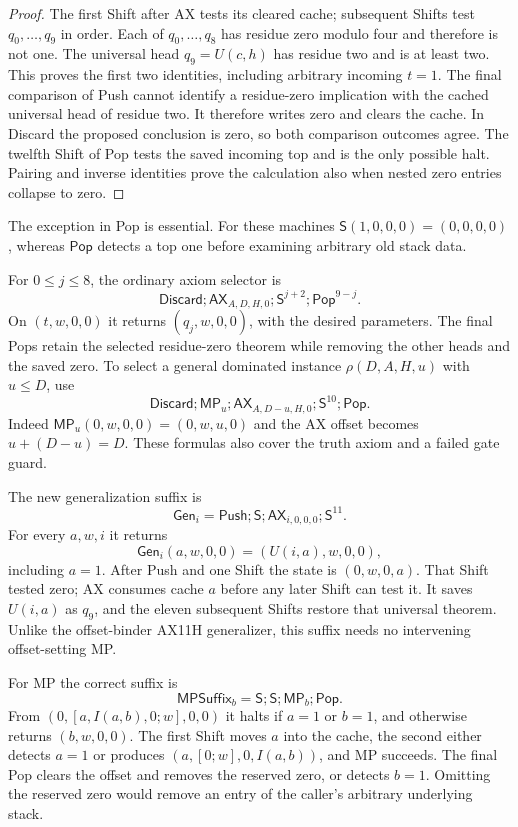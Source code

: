 \documentclass[11pt,a4paper]{article}
\newcommand{\Ax}{\mathsf{AX}}
\newcommand{\MP}{\mathsf{MP}}
\newcommand{\Shift}{\mathsf{S}}
\newcommand{\Push}{\mathsf{Push}}
\newcommand{\Pop}{\mathsf{Pop}}
\newcommand{\Discard}{\mathsf{Discard}}
\newcommand{\Gen}{\mathsf{Gen}}
\begin{document}
\begin{proof}
The first Shift after AX tests its cleared cache; subsequent Shifts
test $q_0,\ldots,q_9$ in order. Each of $q_0,\ldots,q_8$ has residue
zero modulo four and therefore is not one. The universal head
$q_9=U(c,h)$ has residue two and is at least two. This proves the
first two identities, including arbitrary incoming $t=1$.
The final comparison of Push cannot identify a residue-zero
implication with the cached universal head of residue two. It therefore
writes zero and clears the cache. In Discard the proposed conclusion
is zero, so both comparison outcomes agree. The twelfth Shift of Pop
tests the saved incoming top and is the only possible halt. Pairing
and inverse identities prove the calculation also when nested
zero entries collapse to zero.
\end{proof}

The exception in Pop is essential. For these machines
$\Shift(1,0,0,0)=(0,0,0,0)$, whereas $\Pop$ detects a top one before
examining arbitrary old stack data.

For $0\le j\le8$, the ordinary axiom selector is
\[
 \Discard;\Ax_{A,D,H,0};\Shift^{j+2};\Pop^{9-j}.
\]
On $(t,w,0,0)$ it returns $(q_j,w,0,0)$, with the desired parameters.
The final Pops retain the selected residue-zero theorem while removing
the other heads and the saved zero. To select a general dominated
instance $\rho(D,A,H,u)$ with $u\le D$, use
\[
 \Discard;\MP_u;\Ax_{A,D-u,H,0};\Shift^{10};\Pop.
\]
Indeed $\MP_u(0,w,0,0)=(0,w,u,0)$ and the AX offset becomes
$u+(D-u)=D$. These formulas also cover the truth axiom and a failed
gate guard.

The new generalization suffix is
\[
 \boxed{\Gen_i=\Push;\Shift;\Ax_{i,0,0,0};\Shift^{11}.}
\]
For every $a,w,i$ it returns
\[
 \Gen_i(a,w,0,0)=(U(i,a),w,0,0),
\]
including $a=1$. After Push and one Shift the state is $(0,w,0,a)$.
That Shift tested zero; AX consumes cache $a$ before any later Shift
can test it. It saves $U(i,a)$ as $q_9$, and the eleven subsequent
Shifts restore that universal theorem. Unlike the offset-binder
AX11H generalizer, this suffix needs no intervening offset-setting MP.

For MP the correct suffix is
\[
 \mathsf{MPSuffix}_b=\Shift;\Shift;\MP_b;\Pop.
\]
From $(0,[a,I(a,b),0;w],0,0)$ it halts if $a=1$ or $b=1$,
and otherwise returns $(b,w,0,0)$. The first Shift moves $a$ into
the cache, the second either detects $a=1$ or produces
$(a,[0;w],0,I(a,b))$, and MP succeeds. The final Pop clears the
offset and removes the reserved zero, or detects $b=1$.
Omitting the reserved zero would remove an entry of the caller's
arbitrary underlying stack.
\end{document}
